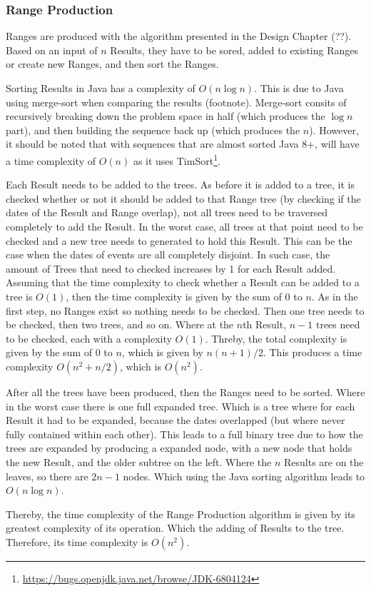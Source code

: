 \subsubsection{Range Production}
\par Ranges are produced with the algorithm presented in the Design Chapter (??). Based on an input of $n$ Results, they have to be sored, added to existing Ranges or create new Ranges, and then sort the Ranges.
\par Sorting Results in Java has a complexity of $O(n\log n)$. This is due to Java using merge-sort when comparing the results (footnote). Merge-sort consits of recursively breaking down the problem space in half (which produces the $\log n$ part), and then building the sequence back up (which produces the $n$). However, it should be noted that with sequences that are almost sorted Java 8+, will have a time complexity of $O(n)$ as it uses TimSort\footnote{\url{https://bugs.openjdk.java.net/browse/JDK-6804124}}. 
\par Each Result needs to be added to the trees. As before it is added to a tree, it is checked whether or not it should be added to that Range tree (by checking  if the dates of the Result and Range overlap), not all trees need to be traversed completely to add the Result. In the worst case, all trees at that point need to be checked and a new tree needs to generated to hold this Result. This can be the case when the dates of events are all completely disjoint.  In such case, the amount of Trees that need to checked increases by 1 for each Result added. Assuming that the time complexity to check whether a Result can be added to a tree is $O(1)$, then the time complexity is given by the sum of 0 to $n$. As in the first step, no Ranges exist so nothing needs to be checked. Then one tree needs to be checked, then two trees, and so on. Where at the $n$th Result, $n-1$ trees need to be checked, each with a complexity $O(1)$. Threby, the total complexity is given by the sum of 0 to $n$, which is given by ${n(n+1)}/2$. This produces a time complexity $O({n^2+n}/2)$, which is $O(n^2)$.
\par After all the trees have been produced, then the Ranges need to be sorted. Where in the worst case there is one full expanded tree. Which is a tree where for each Result it had to be expanded, because the dates overlapped (but where never fully contained within each other). This leads to a full binary tree due to how the trees are expanded by producing a expanded node, with a new node that holds the new Result, and the older subtree on the left. Where the $n$ Results are on the leaves, so there are $2n-1$ nodes. Which using the Java sorting algorithm leads to $O(n\log n)$.
\par Thereby, the time complexity of the Range Production algorithm is given by its greatest complexity of its operation. Which the adding of Results to the tree. Therefore, its time complexity is $O(n^2)$.
